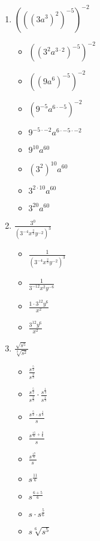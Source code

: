 \documentclass{article}
\begin{document}
\begin{onehalfspace}
\begin{enumerate}[start=69]
        \item $\left( \left( (3a^{3})^{2} \right)^{-5} \right)^{-2}$
        \begin{itemize}
            \item $\left( \left( 3^{2}a^{3 \cdot 2} \right)^{-5} \right)^{-2}$
            \item $\left( \left( 9a^{6} \right)^{-5} \right)^{-2}$
            \item $\left( 9^{-5}a^{6 \cdot -5} \right)^{-2}$
            \item $9^{-5 \cdot -2}a^{6 \cdot -5 \cdot -2}$
            \item $9^{10}a^{60}$
            \item $(3^{2})^{10} a^{60}$
            \item $3^{2 \cdot 10} a^{60}$
            \item $3^{20} a^{60}$
        \end{itemize}

        \item $\frac{3^{0}}{\left( 3^{-4} x^{\frac{2}{3}} y^{-2} \right)^{3}}$
        \begin{itemize}
            \item $\frac{1}{\left( 3^{-4} x^{\frac{2}{3}} y^{-2} \right)^{3}}$
            \item $\frac{1}{3^{-12} x^{2} y^{-6}}$
            \item $\frac{1 \cdot 3^{12} y^{6}}{x^{2}}$
            \item $\frac{3^{12} y^{6}}{x^{2}}$
        \end{itemize}

        \item $\frac{\sqrt{s^{5}}}{\sqrt[3]{s^{2}}}$
        \begin{itemize}
            \item $\frac{s^{\frac{5}{2}}}{s^{\frac{2}{3}}}$
            \item $\frac{s^{\frac{5}{2}}}{s^{\frac{2}{3}}} \cdot \frac{s^{\frac{1}{3}}}{s^{\frac{1}{3}}}$
            \item $\frac{s^{\frac{5}{2}} \cdot s^{\frac{1}{3}}}{s}$
            \item $\frac{s^{\frac{15}{6} + \frac{2}{6}}}{s}$
            \item $\frac{s^{\frac{17}{6}}}{s}$
            \item $s^{\frac{11}{6}}$
            \item $s^{\frac{6 + 5}{6}}$
            \item $s \cdot s^{\frac{5}{6}}$
            \item $s \sqrt[6]{s^{5}}$
        \end{itemize}


\end{enumerate}
\end{onehalfspace}
\end{document}
